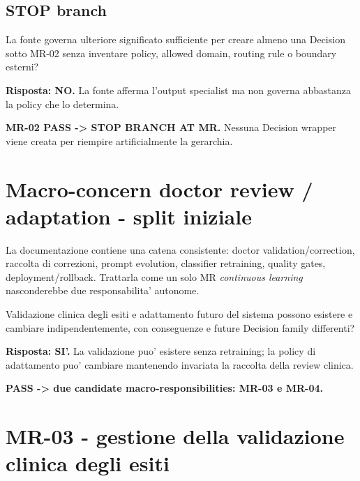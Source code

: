 \documentclass[11pt,a4paper]{article}
\begin{document}
\subsection{STOP branch}

\begin{ddtacheck}[title={Domanda STOP}]
La fonte governa ulteriore significato sufficiente per creare almeno una Decision sotto MR-02 senza inventare policy, allowed domain, routing rule o boundary esterni?
\end{ddtacheck}

\textbf{Risposta: NO.} La fonte afferma l'output specialist ma non governa abbastanza la policy che lo determina.

\begin{ddtaprinciple}[title={STOP result}]
\textbf{MR-02 PASS -> STOP BRANCH AT MR.} Nessuna Decision wrapper viene creata per riempire artificialmente la gerarchia.
\end{ddtaprinciple}

\section{Macro-concern doctor review / adaptation - split iniziale}

La documentazione contiene una catena consistente: doctor validation/correction, raccolta di correzioni, prompt evolution, classifier retraining, quality gates, deployment/rollback. Trattarla come un solo MR \emph{continuous learning} nasconderebbe due responsabilita' autonome.

\begin{ddtacheck}[title={Split question}]
Validazione clinica degli esiti e adattamento futuro del sistema possono esistere e cambiare indipendentemente, con conseguenze e future Decision family differenti?
\end{ddtacheck}

\textbf{Risposta: SI'.} La validazione puo' esistere senza retraining; la policy di adattamento puo' cambiare mantenendo invariata la raccolta della review clinica.

\begin{ddtacore}[title={Split disposition}]
\textbf{PASS -> due candidate macro-responsibilities: MR-03 e MR-04.}
\end{ddtacore}

\section{MR-03 - gestione della validazione clinica degli esiti}
\end{document}
